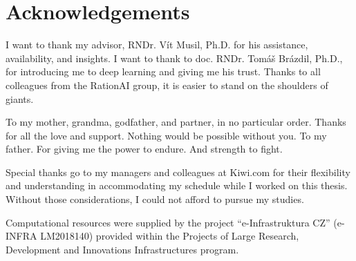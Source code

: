 \chapter*{Acknowledgements}

I want to thank my advisor, RNDr. Vít Musil, Ph.D. for his assistance, availability, and insights.
I want to thank to doc. RNDr. Tomáš Brázdil, Ph.D., for introducing me to deep learning and giving me his trust.
Thanks to all colleagues from the RationAI group, it is easier to stand on the shoulders of giants.

To my mother, grandma, godfather, and partner, in no particular order.
Thanks for all the love and support.
Nothing would be possible without you.
To my father.
For giving me the power to endure.
And strength to fight.

Special thanks go to my managers and colleagues at Kiwi.com for their flexibility and understanding in accommodating my schedule while I worked on this thesis.
Without those considerations, I could not afford to pursue my studies.

Computational resources were supplied by the project ``e-Infrastruktura CZ'' (e-INFRA LM2018140) provided within the Projects of Large Research, Development and Innovations Infrastructures program.

